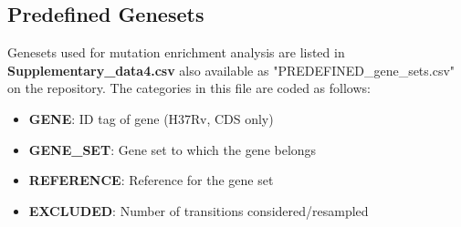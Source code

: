 \documentclass[12pt, oneside]{article}   	%
\begin{document}
\subsection{Predefined Genesets}
Genesets used for mutation enrichment analysis are listed in \textbf{Supplementary\_data4.csv} also available as "PREDEFINED\_gene\_sets.csv" on the repository.
The categories in this file are coded as follows:
\begin{itemize}
\item \textbf{GENE}: ID tag of gene (H37Rv, CDS only)
\item \textbf{GENE\_SET}: Gene set to which the gene belongs
\item \textbf{REFERENCE}: Reference for the gene set
\item \textbf{EXCLUDED}: Number of transitions considered/resampled
\end{itemize}
\end{document}
